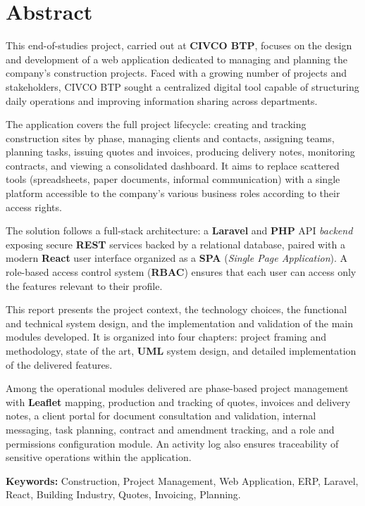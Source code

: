 \chapter*{Abstract}

This end-of-studies project, carried out at \textbf{CIVCO BTP}, focuses on the design and
development of a web application dedicated to managing and planning the company's construction
projects. Faced with a growing number of projects and stakeholders, CIVCO BTP sought a
centralized digital tool capable of structuring daily operations and improving information
sharing across departments.

\vspace{0.35cm}

The application covers the full project lifecycle: creating and tracking construction sites by
phase, managing clients and contacts, assigning teams, planning tasks, issuing quotes and
invoices, producing delivery notes, monitoring contracts, and viewing a consolidated dashboard.
It aims to replace scattered tools (spreadsheets, paper documents, informal communication) with
a single platform accessible to the company's various business roles according to their access
rights.

\vspace{0.35cm}

The solution follows a full-stack architecture: a \textbf{Laravel} and \textbf{PHP} API
\textit{backend} exposing secure \textbf{REST} services backed by a relational database, paired
with a modern \textbf{React} user interface organized as a \textbf{SPA} (\textit{Single Page
Application}). A role-based access control system (\textbf{RBAC}) ensures that each user can
access only the features relevant to their profile.

\vspace{0.35cm}

This report presents the project context, the technology choices, the functional and technical
system design, and the implementation and validation of the main modules developed. It is
organized into four chapters: project framing and methodology, state of the art, \textbf{UML}
system design, and detailed implementation of the delivered features.

\vspace{0.35cm}

Among the operational modules delivered are phase-based project management with \textbf{Leaflet}
mapping, production and tracking of quotes, invoices and delivery notes, a client portal for
document consultation and validation, internal messaging, task planning, contract and amendment
tracking, and a role and permissions configuration module. An activity log also ensures
traceability of sensitive operations within the application.

\vspace{0.5cm}
\noindent\textbf{Keywords:} Construction, Project Management, Web Application, ERP, Laravel,
React, Building Industry, Quotes, Invoicing, Planning.
